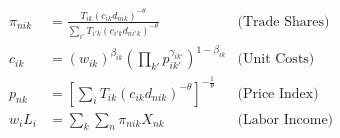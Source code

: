 \begin{align*}
    \pi_{nik} &= \frac{T_{ik} (c_{ik} d_{nik})^{-\theta}}{\sum_{i'} T_{i'k} (c_{i'k} d_{ni'k})^{-\theta}} & \text{(Trade Shares)} \\
    c_{ik} &= (w_{ik})^{\beta_{ik}} \left(\prod_{k'} p_{ik'}^{\gamma_{ik'}}\right)^{1 - \beta_{ik}} & \text{(Unit Costs)} \\
    p_{nk} &= \left[ \sum_{i} T_{ik} (c_{ik} d_{nik})^{-\theta} \right]^{-\frac{1}{\theta}} & \text{(Price Index)} \\
    w_i L_i &= \sum_{k} \sum_{n} \pi_{nik} X_{nk} & \text{(Labor Income)} \\
\end{align*}

